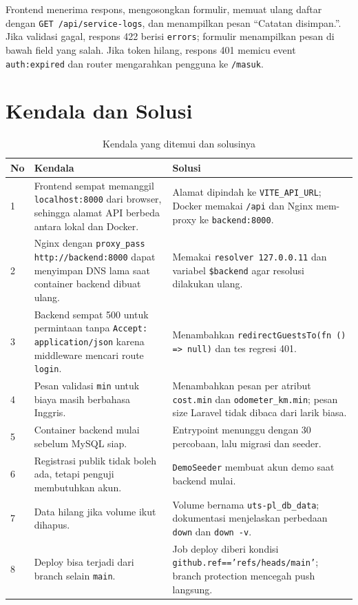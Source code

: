 \documentclass[12pt,a4paper,oneside]{book}
\begin{document}
Frontend menerima respons, mengosongkan formulir, memuat ulang daftar dengan
\texttt{GET /api/service-logs}, dan menampilkan pesan ``Catatan disimpan.''. Jika
validasi gagal, respons 422 berisi \texttt{errors}; formulir menampilkan pesan di
bawah field yang salah. Jika token hilang, respons 401 memicu event
\texttt{auth:expired} dan router mengarahkan pengguna ke \texttt{/masuk}.

\section{Kendala dan Solusi}
\label{sec:kendala}

\begin{table}[H]
\centering
\caption{Kendala yang ditemui dan solusinya}
\label{tab:kendala}
\small
\begin{tabularx}{\textwidth}{@{}p{0.8cm} X X@{}}
\toprule
\textbf{No} & \textbf{Kendala} & \textbf{Solusi} \\
\midrule
1 & Frontend sempat memanggil \texttt{localhost:8000} dari browser, sehingga alamat API berbeda antara lokal dan Docker. & Alamat dipindah ke \texttt{VITE\_API\_URL}; Docker memakai \texttt{/api} dan Nginx mem-proxy ke \texttt{backend:8000}. \\
2 & Nginx dengan \texttt{proxy\_pass http://backend:8000} dapat menyimpan DNS lama saat container backend dibuat ulang. & Memakai \texttt{resolver 127.0.0.11} dan variabel \texttt{\$backend} agar resolusi dilakukan ulang. \\
3 & Backend sempat 500 untuk permintaan tanpa \texttt{Accept: application/json} karena middleware mencari route \texttt{login}. & Menambahkan \texttt{redirectGuestsTo(fn () => null)} dan tes regresi 401. \\
4 & Pesan validasi \texttt{min} untuk biaya masih berbahasa Inggris. & Menambahkan pesan per atribut \texttt{cost.min} dan \texttt{odometer\_km.min}; pesan size Laravel tidak dibaca dari larik biasa. \\
5 & Container backend mulai sebelum MySQL siap. & Entrypoint menunggu dengan 30 percobaan, lalu migrasi dan seeder. \\
6 & Registrasi publik tidak boleh ada, tetapi penguji membutuhkan akun. & \texttt{DemoSeeder} membuat akun demo saat backend mulai. \\
7 & Data hilang jika volume ikut dihapus. & Volume bernama \texttt{uts-pl\_db\_data}; dokumentasi menjelaskan perbedaan \texttt{down} dan \texttt{down -v}. \\
8 & Deploy bisa terjadi dari branch selain \texttt{main}. & Job deploy diberi kondisi \texttt{github.ref}\allowbreak\texttt{==}\allowbreak\texttt{'refs/heads/main'}; branch protection mencegah push langsung. \\

\end{tabularx}
\end{table}
\end{document}
